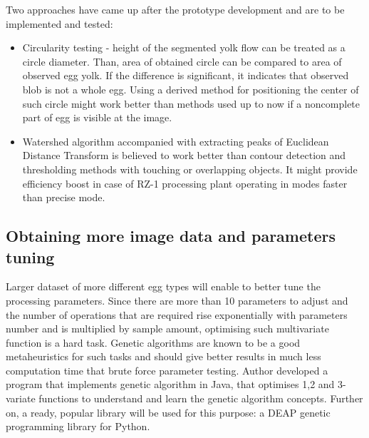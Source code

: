 \documentclass[12pt,twoside,a4paper]{article}
\begin{document}
Two approaches have came up after the prototype development and are to be implemented and tested:

\begin{itemize}
\item Circularity testing - height of the segmented yolk flow can be treated as a circle diameter. Than, area of obtained circle can be compared to area of observed egg yolk. If the difference is significant, it indicates that observed blob is not a whole egg.
Using a derived method for positioning the center of such circle might work better than methods used up to now if a noncomplete part of egg is visible at the image.
\item Watershed algorithm accompanied with extracting peaks of Euclidean Distance Transform is believed to work better than contour detection and thresholding methods with touching or overlapping objects.
It might provide efficiency boost in case of RZ-1 processing plant operating in modes faster than precise mode.\cite{watershed}
\end{itemize}

\subsection{Obtaining more image data and parameters tuning}

Larger dataset of more different egg types will enable to better tune the processing parameters.
Since there are more than 10 parameters to adjust and the number of operations that are required rise exponentially with parameters number and is multiplied by sample amount, optimising such multivariate function is a hard task.
Genetic algorithms are known to be a good metaheuristics for such tasks and should give better results in much less computation time that brute force parameter testing.
Author developed a program that implements genetic algorithm in Java, that optimises 1,2 and 3-variate functions to understand and learn the genetic algorithm concepts.
Further on, a ready, popular library will be used for this purpose: a DEAP genetic programming library for Python.
\end{document}
